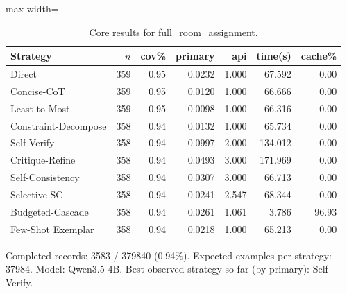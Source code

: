 \documentclass[10pt,twocolumn]{article}
\begin{document}
\begin{table}[t]
\centering
\caption{Core results for full\_room\_assignment.}
\label{tab:full_room_assignment_core}
\begin{adjustbox}{max width=\textwidth}
\begin{tabular}{lrrrrrr}
\toprule
Strategy & $n$ & cov\% & primary & api & time(s) & cache\% \\
\midrule
Direct & 359 & 0.95 & 0.0232 & 1.000 & 67.592 & 0.00 \\
Concise-CoT & 359 & 0.95 & 0.0120 & 1.000 & 66.666 & 0.00 \\
Least-to-Most & 359 & 0.95 & 0.0098 & 1.000 & 66.316 & 0.00 \\
Constraint-Decompose & 358 & 0.94 & 0.0132 & 1.000 & 65.734 & 0.00 \\
Self-Verify & 358 & 0.94 & 0.0997 & 2.000 & 134.012 & 0.00 \\
Critique-Refine & 358 & 0.94 & 0.0493 & 3.000 & 171.969 & 0.00 \\
Self-Consistency & 358 & 0.94 & 0.0307 & 3.000 & 66.713 & 0.00 \\
Selective-SC & 358 & 0.94 & 0.0241 & 2.547 & 68.344 & 0.00 \\
Budgeted-Cascade & 358 & 0.94 & 0.0261 & 1.061 & 3.786 & 96.93 \\
Few-Shot Exemplar & 358 & 0.94 & 0.0218 & 1.000 & 65.213 & 0.00 \\
\bottomrule
\end{tabular}
\end{adjustbox}
\vspace{2pt}\parbox{0.98\textwidth}{\footnotesize Completed records: 3583 / 379840 (0.94\%). Expected examples per strategy: 37984. Model: Qwen3.5-4B. Best observed strategy so far (by primary): Self-Verify.}
\end{table}
\end{document}
